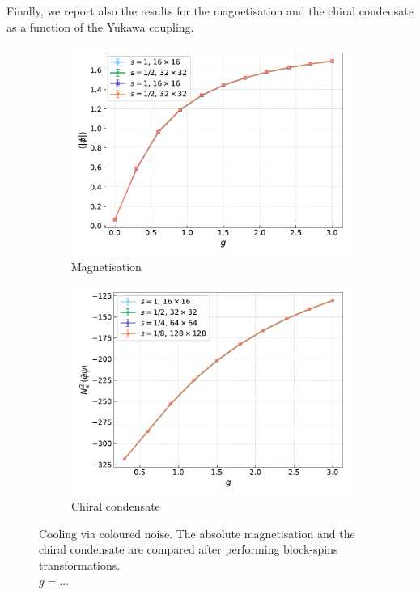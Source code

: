 Finally, we report also the results for the magnetisation and the chiral condensate as a function of the Yukawa coupling.
\begin{figure}[hbp]
    \centering
    \begin{subfigure}[b]{0.48\textwidth}
        \includegraphics[width=1.05\textwidth]{figures/cooling/yukawa_scan/magnetisation.pdf}
        \caption{Magnetisation}
    \end{subfigure}
    \hfill
    \begin{subfigure}[b]{0.48\textwidth}
        \includegraphics[width=1.05\textwidth]{figures/cooling/yukawa_scan/condensate.pdf}
        \caption{Chiral condensate}
    \end{subfigure}
    \caption[Cooling stochastic quantisation: fields as a function of the Yukawa coupling.]{Cooling via coloured noise. The absolute magnetisation and the chiral condensate are compared after performing block-spins transformations. \\ $g = \dots$}
    \label{fig:cooling_M_psibarpsi}
\end{figure}

